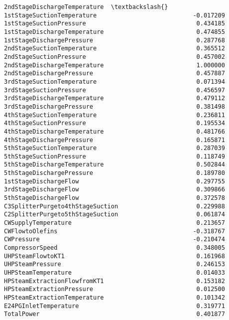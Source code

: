 \documentclass[11pt]{article}
\begin{document}
\begin{tcolorbox}[breakable, size=fbox, boxrule=.5pt, pad at break*=1mm, opacityfill=0]
\begin{Verbatim}[commandchars=\\\{\}]
                                  2ndStageDischargeTemperature  \textbackslash{}
1stStageSuctionTemperature                           -0.017209
1stStageSuctionPressure                               0.434185
1stStageDischargeTemperature                          0.474855
1stStageDischargePressure                             0.287768
2ndStageSuctionTemperature                            0.365512
2ndStageSuctionPressure                               0.457002
2ndStageDischargeTemperature                          1.000000
2ndStageDischargePressure                             0.457887
3rdStageSuctionTemperature                            0.071394
3rdStageSuctionPressure                               0.456597
3rdStageDischargeTemperature                          0.479112
3rdStageDischargePressure                             0.381498
4thStageSuctionTemperature                            0.236811
4thStageSuctionPressure                               0.195534
4thStageDischargeTemperature                          0.481766
4thStageDischargePressure                             0.165871
5thStageSuctionTemperature                            0.287039
5thStageSuctionPressure                               0.118749
5thStageDischargeTemperature                          0.502844
5thStageDischargePressure                             0.189780
1stStageDischargeFlow                                 0.297755
3rdStageDischargeFlow                                 0.309866
5thStageDischargeFlow                                 0.372578
C3SplitterPurgeto4thStageSuction                      0.229988
C2SplitterPurgeto5thStageSuction                      0.061874
CWSupplyTemperature                                   0.213657
CWFlowtoOlefins                                      -0.318767
CWPressure                                           -0.210474
CompressorSpeed                                       0.348005
UHPSteamFlowtoKT1                                     0.161968
UHPSteamPressure                                      0.246153
UHPSteamTemperature                                   0.014033
HPSteamExtractionFlowfromKT1                          0.153182
HPSteamExtractionPressure                             0.012500
HPSteamExtractionTemperature                          0.101342
E24PGInletTemperature                                 0.319771
TotalPower                                            0.401877


\end{Verbatim}
\end{tcolorbox}
\end{document}
